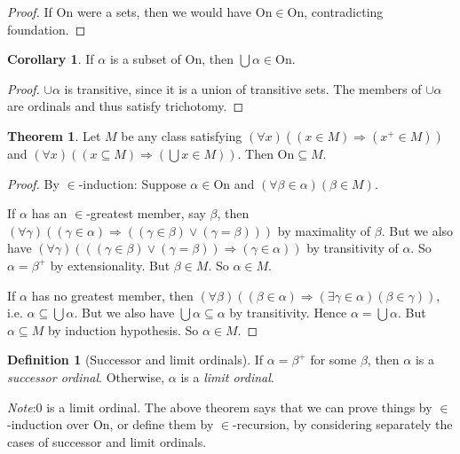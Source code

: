 \documentclass[a4paper]{article}
\theoremstyle{definition}
\newtheorem*{thm}{Theorem}
\newtheorem*{defi}{Definition}
\newtheorem*{cor}{Corollary}
\newcommand{\note}{\noindent \emph{Note}:\;}
\newcommand{\On}{\mathrm{On}}
\begin{document}
\begin{proof}
  If $\On$ were a sets, then we would have $\On\in \On$, contradicting foundation.
\end{proof}

\begin{cor}
  If $\alpha$ is a subset of $\On$, then $\bigcup \alpha\in \On$.
\end{cor}

\begin{proof}
  $\cup\alpha$ is transitive, since it is a union of transitive sets. The members of $\cup \alpha$ are ordinals and thus satisfy trichotomy.
\end{proof}

\begin{thm}
  Let $M$ be any class satisfying $(\forall x)((x\in M)\Rightarrow (x^+\in M))$ and $(\forall x)((x\subseteq M)\Rightarrow (\bigcup x\in M))$. Then $\On\subseteq M$.
\end{thm}

\begin{proof}
  By $\in$-induction: Suppose $\alpha\in \On$ and $(\forall \beta\in \alpha)(\beta\in M)$.

  If $\alpha$ has an $\in$-greatest member, say $\beta$, then $(\forall \gamma)((\gamma\in \alpha) \Rightarrow ((\gamma\in \beta)\vee(\gamma = \beta)))$ by maximality of $\beta$. But we also have $(\forall \gamma)(((\gamma\in \beta)\vee(\gamma = \beta))\Rightarrow(\gamma\in\alpha))$ by transitivity of $\alpha$. So $\alpha = \beta^+$ by extensionality. But $\beta\in M$. So $\alpha\in M$.

  If $\alpha$ has no greatest member, then $(\forall \beta)((\beta\in \alpha)\Rightarrow (\exists \gamma\in \alpha)(\beta\in\gamma))$, i.e. $\alpha\subseteq \bigcup \alpha$. But we also have $\bigcup \alpha\subseteq \alpha$ by transitivity. Hence $\alpha = \bigcup \alpha$. But $\alpha\subseteq M$ by induction hypothesis. So $\alpha\in M$.
\end{proof}

\begin{defi}[Successor and limit ordinals]
  If $\alpha = \beta^+$ for some $\beta$, then $\alpha$ is a \emph{successor ordinal}. Otherwise, $\alpha$ is a \emph{limit ordinal}.
\end{defi}

\note $0$ is a limit ordinal. The above theorem says that we can prove things by $\in$-induction over $\On$, or define them by $\in$-recursion, by considering separately the cases of successor and limit ordinals.
\end{document}
